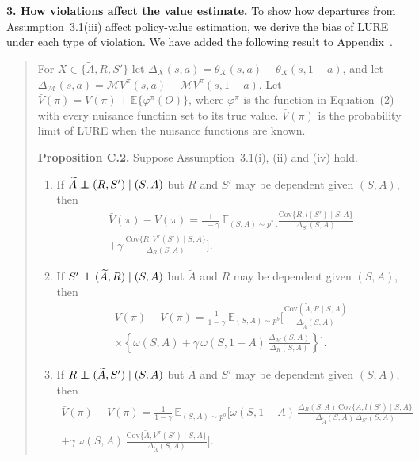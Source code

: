 \documentclass[12pt]{article}
\newcommand{\Cov}{{\mbox{Cov}}}
\newcommand{\res}[1]{{\color{red}{#1}}}
\newcommand\independent{\protect\mathpalette{\protect\independenT}{\perp}}
\def\independenT#1#2{\mathrel{\rlap{$#1#2$}\mkern2mu{#1#2}}}
\newcommand{\0}{\boldsymbol{0}}
\theoremstyle{definition}
\newcommand{\E}{\mathbb{E}}
\newenvironment{reproducedtext}{\begin{quote}\small}{\end{quote}}
\begin{document}
\textbf{3. How violations affect the value estimate.} To show how departures from Assumption~3.1(iii) affect policy-value estimation, we derive the bias of LURE under each type of violation. We have added the following result to Appendix~\res{C}.
\begin{reproducedtext}
For $X\in\{\widetilde A,R,S'\}$ let $\Delta_X(s,a)=\theta_X(s,a)-\theta_X(s,1-a)$, and let $\Delta_{\mathcal M}(s,a)=\mathcal MV^\pi(s,a)-\mathcal MV^\pi(s,1-a)$. Let $\bar V(\pi)=V(\pi)+\E\{\varphi^\pi(O)\}$, where $\varphi^\pi$ is the function in Equation~(2) with every nuisance function set to its true value. $\bar V(\pi)$ is the probability limit of LURE when the nuisance functions are known.

\textbf{Proposition C.2.} Suppose Assumption~3.1(i), (ii) and (iv) hold.
\begin{enumerate}[label=(\alph*)]
\item If $\widetilde A\independent (R,S')\mid (S,A)$ but $R$ and $S'$ may be dependent given $(S,A)$, then
\begin{multline*}
\bar V(\pi)-V(\pi)=\frac{1}{1-\gamma}\,\E_{(S,A)\sim p^*}\bigg[\frac{\Cov\{R,l(S')\mid S,A\}}{\Delta_{S'}(S,A)}\\
+\gamma\,\frac{\Cov\{R,V^\pi(S')\mid S,A\}}{\Delta_R(S,A)}\bigg].
\end{multline*}
\item If $S'\independent (\widetilde A,R)\mid (S,A)$ but $\widetilde A$ and $R$ may be dependent given $(S,A)$, then
\begin{multline*}
\bar V(\pi)-V(\pi)=\frac{1}{1-\gamma}\,\E_{(S,A)\sim p^b}\bigg[\frac{\Cov(\widetilde A,R\mid S,A)}{\Delta_{\widetilde A}(S,A)}\\
\times\left\{\omega(S,A)+\gamma\,\omega(S,1-A)\,\frac{\Delta_{\mathcal M}(S,A)}{\Delta_R(S,A)}\right\}\bigg].
\end{multline*}
\item If $R\independent (\widetilde A,S')\mid (S,A)$ but $\widetilde A$ and $S'$ may be dependent given $(S,A)$, then
\begin{multline*}
\bar V(\pi)-V(\pi)=\frac{1}{1-\gamma}\,\E_{(S,A)\sim p^b}\bigg[\omega(S,1-A)\,\frac{\Delta_R(S,A)\,\Cov\{\widetilde A,l(S')\mid S,A\}}{\Delta_{\widetilde A}(S,A)\,\Delta_{S'}(S,A)}\\
+\gamma\,\omega(S,A)\,\frac{\Cov\{\widetilde A,V^\pi(S')\mid S,A\}}{\Delta_{\widetilde A}(S,A)}\bigg].
\end{multline*}
\end{enumerate}


\end{reproducedtext}
\end{document}
